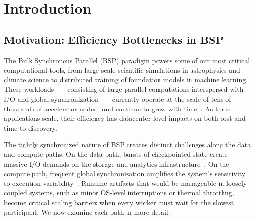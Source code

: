 
\chapter{Introduction}

\section{Motivation: Efficiency Bottlenecks in BSP}

The Bulk Synchronous Parallel (BSP) paradigm powers some of our most critical computational tools,
from large-scale scientific simulations in astrophysics and climate science to distributed training
of foundation models in machine learning.
These workloads ---- consisting of large parallel computations interspersed with I/O and global
synchronization ---- currently operate at the scale of tens of thousands of accelerator
nodes~\cite{Das2023:LargeScale,Stock2024:LargeScale,Gratt2024:Llama3Scale,:LlamaScale} and continue
to grow with time~\cite{Rahma2024:MLScale}.
As these applications scale, their efficiency has datacenter-level impacts on both cost and
time-to-discovery.

The tightly synchronized nature of BSP creates distinct challenges along the data and compute
paths.
On the data path, bursts of checkpointed state create massive I/O demands on the storage and
analytics
infrastructure~\cite{Jones2012:Checkpointing,Eisen2022:Checkpoint,Lian2025:UniversalCheckpointing}.
On the compute path, frequent global synchronization amplifies the system's sensitivity to
execution
variability~\cite{Hoefl2010:Noise,Petri2003:Missing,Yildi2016:IONoise,Kocol2018:Varbench,Acun2016:Variation}.
Runtime artifacts that would be manageable in loosely coupled systems, such as minor OS-level
interruptions or thermal throttling, become critical scaling barriers when every worker must wait
for the slowest participant.
We now examine each path in more detail.


